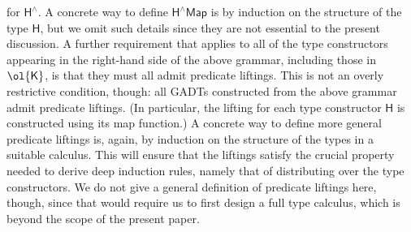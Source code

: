 \documentclass[sigplan,10pt,anonymous,review]{acmart}
\begin{document}
for $\mathsf{H^{\wedge}}$. A concrete way to define $\mathsf{H^\wedge
  Map}$ is by induction on the structure of the type $\mathsf{H}$, but
we omit such details since they are not essential to the present
discussion. A further requirement that applies to all of the type
constructors appearing in the right-hand side of the above grammar,
including those in $\ol{\mathsf{K}}$, is that they must all admit
predicate liftings. This is not an overly restrictive condition,
though: all
GADTs constructed from the above grammar admit predicate liftings.
(In particular, the lifting for each type constructor $\mathsf{H}$ is
constructed using its map function.)
A concrete way to define more general predicate liftings is, again, by
induction on the structure of the types in a suitable calculus. This
will ensure that the liftings satisfy the crucial property needed to
derive deep induction rules, namely that of distributing over the type
constructors. We do not give a general definition of predicate
liftings here, though, since that would require us to first design a
full type calculus, which is beyond the scope of the present paper.
\end{document}
